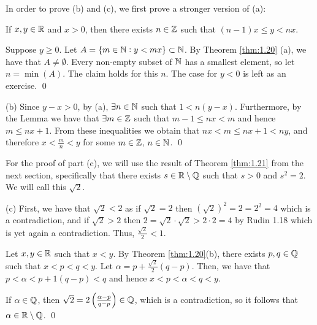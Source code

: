 In order to prove (b) and (c), we first prove a stronger version of (a):
\begin{nlemma}{}
    If $x, y \in \mathbb{R}$ and $x > 0$, then there exists $n \in \mathbb{Z}$ such that $(n-1)x \leq y < nx$. 
\end{nlemma}
\begin{nproof}
    Suppose $y \geq 0$. Let $A = \set{m \in \mathbb{N}: y < mx} \subset \mathbb{N}$. By Theorem \ref{thm:1.20} (a), we have that $A \neq \emptyset$. Every non-empty subset of $\mathbb{N}$ has a smallest element, so let $n = \min(A)$. The claim holds for this $n$.
    The case for $y < 0$ is left as an exercise. \qed
\end{nproof}
\begin{nproof}
    (b) Since $y - x > 0$, by (a), $\exists n \in \mathbb{N}$ such that $1 < n(y-x)$. Furthermore, by the Lemma we have that $\exists m \in \mathbb{Z}$ such that $m - 1 \leq nx < m$ and hence $m \leq nx + 1$. From these inequalities we obtain that $nx < m \leq nx + 1 < ny$, and therefore $x < \frac{m}{n} < y$ for some $m \in \mathbb{Z}$, $n \in \mathbb{N}$. \qed
\end{nproof}
For the proof of part (c), we will use the result of Theorem \ref{thm:1.21} from the next section, specifically that there exists $s \in \mathbb{R} \setminus \mathbb{Q}$ such that $s > 0$ and $s^2 = 2$. We will call this $\sqrt{2}$.
\begin{nproof}
    (c) First, we have that $\sqrt{2} < 2$ as if $\sqrt{2} = 2$ then $(\sqrt{2})^2 = 2 = 2^2 = 4$ which is a contradiction, and if $\sqrt{2} > 2$ then $2 = \sqrt{2}\cdot \sqrt{2} > 2\cdot 2 = 4$ by Rudin 1.18 which is yet again a contradiction. Thus, $\frac{\sqrt{2}}{2} < 1$. 
    
    Let $x, y \in \mathbb{R}$ such that $x < y$. By Theorem \ref{thm:1.20}(b), there exists $p, q \in \mathbb{Q}$ such that $x < p < q < y$. Let $\alpha = p + \frac{\sqrt{2}}{2}(q - p)$. Then, we have that $p  <\alpha < p + 1(q-p) < q$ and hence $x < p < \alpha < q < y$.

    If $\alpha \in \mathbb{Q}$, then $\sqrt{2} = 2\left(\frac{\alpha-p}{q-p}\right) \in \mathbb{Q}$, which is a contradiction, so it follows that $\alpha \in \mathbb{R} \setminus \mathbb{Q}$. \qed
\end{nproof}

